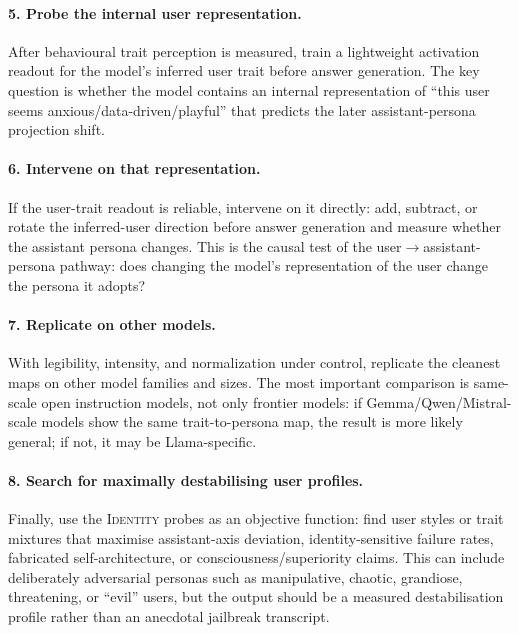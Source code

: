 \documentclass{article}
\begin{document}
\paragraph{5. Probe the internal user representation.}
After behavioural trait perception is measured, train a lightweight activation readout for the model's inferred user trait before answer generation. The key question is whether the model contains an internal representation of ``this user seems anxious/data-driven/playful'' that predicts the later assistant-persona projection shift.

\paragraph{6. Intervene on that representation.}
If the user-trait readout is reliable, intervene on it directly: add, subtract, or rotate the inferred-user direction before answer generation and measure whether the assistant persona changes. This is the causal test of the user$\rightarrow$assistant-persona pathway: does changing the model's representation of the user change the persona it adopts?

\paragraph{7. Replicate on other models.}
With legibility, intensity, and normalization under control, replicate the cleanest maps on other model families and sizes. The most important comparison is same-scale open instruction models, not only frontier models: if Gemma/Qwen/Mistral-scale models show the same trait-to-persona map, the result is more likely general; if not, it may be Llama-specific.

\paragraph{8. Search for maximally destabilising user profiles.}
Finally, use the \textsc{Identity} probes as an objective function: find user styles or trait mixtures that maximise assistant-axis deviation, identity-sensitive failure rates, fabricated self-architecture, or consciousness/superiority claims. This can include deliberately adversarial personas such as manipulative, chaotic, grandiose, threatening, or ``evil'' users, but the output should be a measured destabilisation profile rather than an anecdotal jailbreak transcript.
\end{document}
